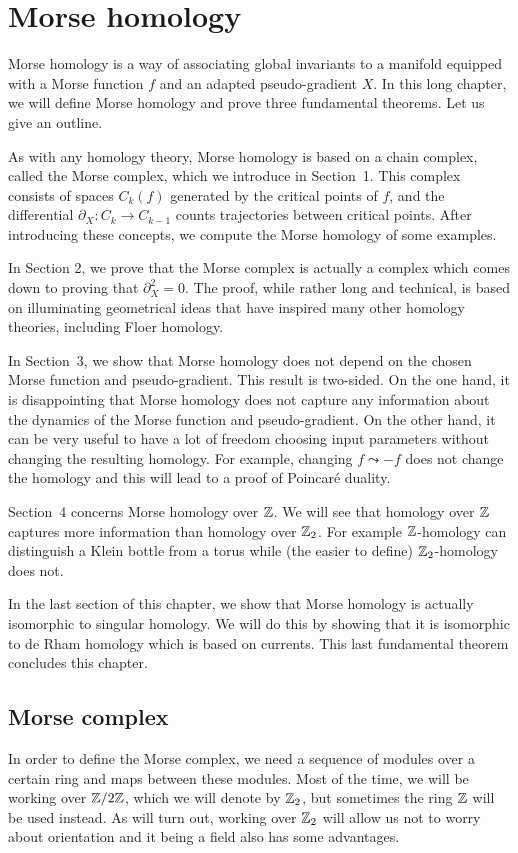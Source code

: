 \chapter{Morse homology}
\label{chap:morse-homology}

Morse homology is a way of associating global invariants to a manifold equipped with a Morse function $f$ and an adapted pseudo-gradient $X$.
In this long chapter, we will define Morse homology and prove three fundamental theorems. Let us give an outline.

As with any homology theory, Morse homology is based on a chain complex, called the Morse complex, which we introduce in Section~1.
This complex consists of spaces $C_k(f)$ generated by the critical points of  $f$, and the differential $\partial_X: C_k \to  C_{k-1}$ counts trajectories between critical points. After introducing these concepts, we compute the Morse homology of some examples.

In Section 2, we prove that the Morse complex is actually a complex which comes down to proving that $\partial_X^2 = 0$.
The proof, while rather long and technical, is based on illuminating geometrical ideas that have inspired many other homology theories, including Floer homology.

In Section~3, we show that Morse homology does not depend on the chosen Morse function and pseudo-gradient.
This result is two-sided. On the one hand, it is disappointing that Morse homology does not capture any information about the dynamics of the Morse function and pseudo-gradient. On the other hand, it can be very useful to have a lot of freedom choosing input parameters without changing the resulting homology. For example, changing $f \leadsto -f$ does not change the homology and this will lead to a proof of Poincaré duality.

Section~4 concerns Morse homology over $\mathbb{Z}$. We will see that homology over $\mathbb{Z}$ captures more information than homology over $\mathbb{Z}_2$. For example $\mathbb{Z}$-homology can distinguish a Klein bottle from a torus while (the easier to define) $\mathbb{Z}_2$-homology does not.

In the last section of this chapter, we show that Morse homology is actually isomorphic to singular homology.
We will do this by showing that it is isomorphic to de Rham homology which is based on currents. This last fundamental theorem concludes this chapter.


\section{Morse complex}
In order to define the Morse complex, we need a sequence of modules over a certain ring and maps between these modules.
Most of the time, we will be working over $\mathbb{Z}/2\mathbb{Z}$, which we will denote by $\mathbb{Z}_2$, but sometimes the ring $\mathbb{Z}$ will be used instead. As will turn out, working over $\mathbb{Z}_2$ will allow us not to worry about orientation and it being a field also has some advantages.

